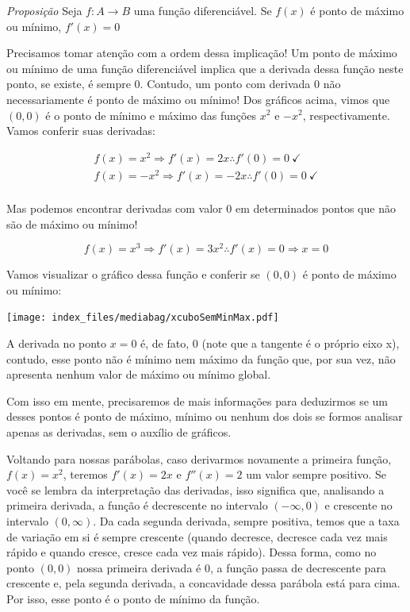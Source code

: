\documentclass[
  letterpaper,
  DIV=11,
  numbers=noendperiod]{scrreprt}
\begin{document}
\emph{Proposição} Seja \(f: A\rightarrow B\) uma função diferenciável.
Se \(f(x)\) é ponto de máximo ou mínimo, \(f'(x) = 0\)

Precisamos tomar atenção com a ordem dessa implicação! Um ponto de
máximo ou mínimo de uma função diferenciável implica que a derivada
dessa função neste ponto, se existe, é sempre 0. Contudo, um ponto com
derivada 0 não necessariamente é ponto de máximo ou mínimo! Dos gráficos
acima, vimos que \((0,0)\) é o ponto de mínimo e máximo das funções
\(x^2\) e \(-x^2\), respectivamente. Vamos conferir suas derivadas:

\[
\begin{aligned}
    f(x) = x^2 \Rightarrow f'(x) = 2x \therefore f'(0) = 0~ \checkmark \\
    f(x) = -x^2 \Rightarrow f'(x) = -2x \therefore f'(0) = 0 ~\checkmark \\
\end{aligned}
\]

Mas podemos encontrar derivadas com valor 0 em determinados pontos que
não são de máximo ou mínimo!

\[
f(x) = x^3 \Rightarrow f'(x) = 3x^2 \therefore f'(x) = 0 \Rightarrow x = 0
\]

Vamos visualizar o gráfico dessa função e conferir se \((0,0)\) é ponto
de máximo ou mínimo:

\texttt{[image: index\_files/mediabag/xcuboSemMinMax.pdf]}

A derivada no ponto \(x=0\) é, de fato, \(0\) (note que a tangente é o
próprio eixo x), contudo, esse ponto não é mínimo nem máximo da função
que, por sua vez, não apresenta nenhum valor de máximo ou mínimo global.

Com isso em mente, precisaremos de mais informações para deduzirmos se
um desses pontos é ponto de máximo, mínimo ou nenhum dos dois se formos
analisar apenas as derivadas, sem o auxílio de gráficos.

Voltando para nossas parábolas, caso derivarmos novamente a primeira
função, \(f(x) = x^2\), teremos \(f'(x) = 2x\) e \(f''(x) = 2\) um valor
sempre positivo. Se você se lembra da interpretação das derivadas, isso
significa que, analisando a primeira derivada, a função é decrescente no
intervalo \((-\infty, 0)\) e crescente no intervalo \((0, \infty)\). Da
cada segunda derivada, sempre positiva, temos que a taxa de variação em
si é sempre crescente (quando decresce, decresce cada vez mais rápido e
quando cresce, cresce cada vez mais rápido). Dessa forma, como no ponto
\((0,0)\) nossa primeira derivada é 0, a função passa de decrescente
para crescente e, pela segunda derivada, a concavidade dessa parábola
está para cima. Por isso, esse ponto é o ponto de mínimo da função.
\end{document}
